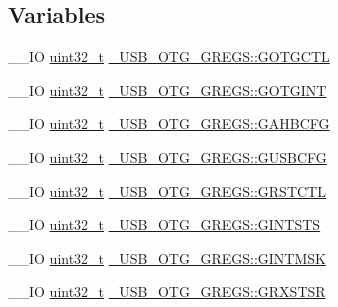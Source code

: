 \subsection*{Variables}
\begin{DoxyCompactItemize}
\item 
\-\_\-\-\_\-\-I\-O \hyperlink{stdint_8h_a435d1572bf3f880d55459d9805097f62}{uint32\-\_\-t} \hyperlink{group___u_s_b___o_t_g___d_r_i_v_e_r_ga6fb89e8b4dd062729b74e8786592e545}{\-\_\-\-U\-S\-B\-\_\-\-O\-T\-G\-\_\-\-G\-R\-E\-G\-S\-::\-G\-O\-T\-G\-C\-T\-L}
\item 
\-\_\-\-\_\-\-I\-O \hyperlink{stdint_8h_a435d1572bf3f880d55459d9805097f62}{uint32\-\_\-t} \hyperlink{group___u_s_b___o_t_g___d_r_i_v_e_r_ga12c69f2304e2bb34c0972bb4f13c7ba3}{\-\_\-\-U\-S\-B\-\_\-\-O\-T\-G\-\_\-\-G\-R\-E\-G\-S\-::\-G\-O\-T\-G\-I\-N\-T}
\item 
\-\_\-\-\_\-\-I\-O \hyperlink{stdint_8h_a435d1572bf3f880d55459d9805097f62}{uint32\-\_\-t} \hyperlink{group___u_s_b___o_t_g___d_r_i_v_e_r_ga06c4430bf0ae0fb15f7bb958aea887fd}{\-\_\-\-U\-S\-B\-\_\-\-O\-T\-G\-\_\-\-G\-R\-E\-G\-S\-::\-G\-A\-H\-B\-C\-F\-G}
\item 
\-\_\-\-\_\-\-I\-O \hyperlink{stdint_8h_a435d1572bf3f880d55459d9805097f62}{uint32\-\_\-t} \hyperlink{group___u_s_b___o_t_g___d_r_i_v_e_r_ga9685dd6f94efe8f30a49ce1ffca59481}{\-\_\-\-U\-S\-B\-\_\-\-O\-T\-G\-\_\-\-G\-R\-E\-G\-S\-::\-G\-U\-S\-B\-C\-F\-G}
\item 
\-\_\-\-\_\-\-I\-O \hyperlink{stdint_8h_a435d1572bf3f880d55459d9805097f62}{uint32\-\_\-t} \hyperlink{group___u_s_b___o_t_g___d_r_i_v_e_r_ga3770b3b36182131eb65631fb5ca071bf}{\-\_\-\-U\-S\-B\-\_\-\-O\-T\-G\-\_\-\-G\-R\-E\-G\-S\-::\-G\-R\-S\-T\-C\-T\-L}
\item 
\-\_\-\-\_\-\-I\-O \hyperlink{stdint_8h_a435d1572bf3f880d55459d9805097f62}{uint32\-\_\-t} \hyperlink{group___u_s_b___o_t_g___d_r_i_v_e_r_ga55882277285fb2848a0598d078890834}{\-\_\-\-U\-S\-B\-\_\-\-O\-T\-G\-\_\-\-G\-R\-E\-G\-S\-::\-G\-I\-N\-T\-S\-T\-S}
\item 
\-\_\-\-\_\-\-I\-O \hyperlink{stdint_8h_a435d1572bf3f880d55459d9805097f62}{uint32\-\_\-t} \hyperlink{group___u_s_b___o_t_g___d_r_i_v_e_r_ga6f14e249d3ef50307a23c4ddc7f12368}{\-\_\-\-U\-S\-B\-\_\-\-O\-T\-G\-\_\-\-G\-R\-E\-G\-S\-::\-G\-I\-N\-T\-M\-S\-K}
\item 
\-\_\-\-\_\-\-I\-O \hyperlink{stdint_8h_a435d1572bf3f880d55459d9805097f62}{uint32\-\_\-t} \hyperlink{group___u_s_b___o_t_g___d_r_i_v_e_r_ga4407ec0a1191e4409afca7f4725db8fd}{\-\_\-\-U\-S\-B\-\_\-\-O\-T\-G\-\_\-\-G\-R\-E\-G\-S\-::\-G\-R\-X\-S\-T\-S\-R}

\end{DoxyCompactItemize}
